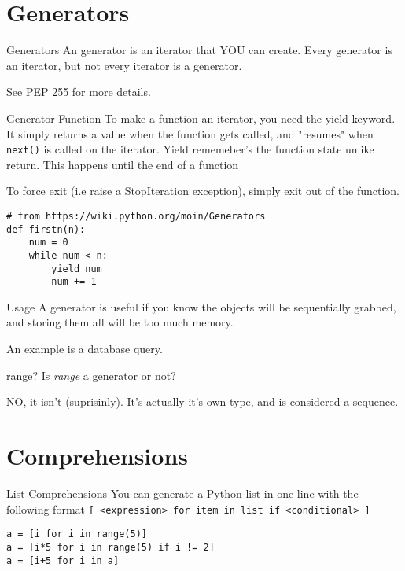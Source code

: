 \section{Generators}

\begin{frame}{Generators}
  An generator is an iterator that YOU can create. Every generator is an iterator, but not every iterator is a generator.

  See PEP 255 for more details.
\end{frame}

\begin{frame}[containsverbatim]{Generator Function}
  To make a function an iterator, you need the yield keyword. It simply returns a value when the function gets called, and "resumes" when \texttt{next()} is called on the iterator. Yield rememeber's the function state unlike return. This happens until the end of a function

  To force exit (i.e raise a StopIteration exception), simply exit out of the function.
  \begin{verbatim}
# from https://wiki.python.org/moin/Generators
def firstn(n):
    num = 0
    while num < n:
        yield num
        num += 1
  \end{verbatim}
\end{frame}

\begin{frame}{Usage}
  A generator is useful if you know the objects will be sequentially grabbed, and storing them all will be too much memory.

  An example is a database query.
\end{frame}

\begin{frame}{range?}
  Is \textit{range} a generator or not?\pause

  NO, it isn't (suprisinly). It's actually it's own type, and is considered a sequence.
\end{frame}

\section{Comprehensions}
\begin{frame}[containsverbatim]{List Comprehensions}
  You can generate a Python list in one line with the following format \verb|[ <expression> for item in list if <conditional> ]|

  \begin{verbatim}
a = [i for i in range(5)]
a = [i*5 for i in range(5) if i != 2]
a = [i+5 for i in a]
  \end{verbatim}
\end{frame}

